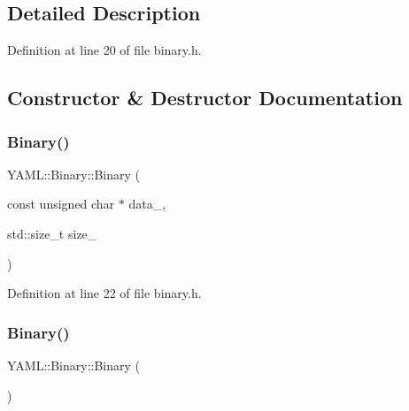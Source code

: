 \subsection{Detailed Description}


Definition at line 20 of file binary.\+h.



\subsection{Constructor \& Destructor Documentation}
\mbox{\label{class_y_a_m_l_1_1_binary_a4eae01da78eb8386a4d405f497baf33c}} 
\subsubsection{\texorpdfstring{Binary()}{Binary()}\hspace{0.1cm}{\footnotesize\ttfamily [1/4]}}
{\footnotesize\ttfamily Y\+A\+M\+L\+::\+Binary\+::\+Binary (\begin{DoxyParamCaption}\item[{const unsigned char $\ast$}]{data\+\_\+,  }\item[{std\+::size\+\_\+t}]{size\+\_\+ }\end{DoxyParamCaption})\hspace{0.3cm}{\ttfamily [inline]}}



Definition at line 22 of file binary.\+h.

\mbox{\label{class_y_a_m_l_1_1_binary_a65696964578e5f5c5f9ec1ee9f06e1ab}} 
\subsubsection{\texorpdfstring{Binary()}{Binary()}\hspace{0.1cm}{\footnotesize\ttfamily [2/4]}}
{\footnotesize\ttfamily Y\+A\+M\+L\+::\+Binary\+::\+Binary (\begin{DoxyParamCaption}{ }\end{DoxyParamCaption})\hspace{0.3cm}{\ttfamily [inline]}}



